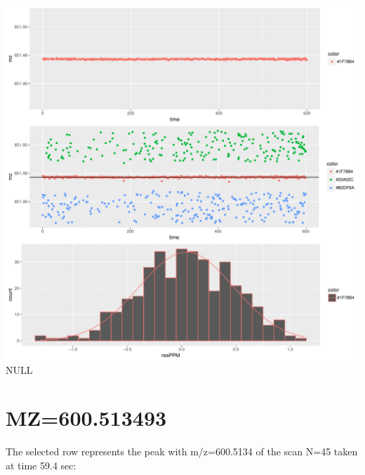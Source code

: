 \documentclass[]{article}
\newenvironment{Shaded}{\begin{snugshade}}{\end{snugshade}}
\newcommand{\KeywordTok}[1]{\textcolor[rgb]{0.13,0.29,0.53}{\textbf{#1}}}
\newcommand{\FloatTok}[1]{\textcolor[rgb]{0.00,0.00,0.81}{#1}}
\newcommand{\OperatorTok}[1]{\textcolor[rgb]{0.81,0.36,0.00}{\textbf{#1}}}
\newcommand{\NormalTok}[1]{#1}
\begin{document}
\includegraphics{Supplementary_document_files/figure-latex/filter.lm.651-1.pdf}
NULL

\section{MZ=600.513493}\label{mz600.513493}

\begin{Shaded}
\end{Shaded}

The selected row represents the peak with m/z=600.5134 of the scan N=45
taken at time 59.4 sec:

\begin{Shaded}
\end{Shaded}
\end{document}

